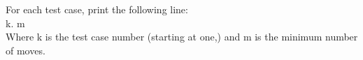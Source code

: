 For each test case, print the following line:
\\k. m
\\Where k is the test case number (starting at one,) and m is the minimum number of moves.